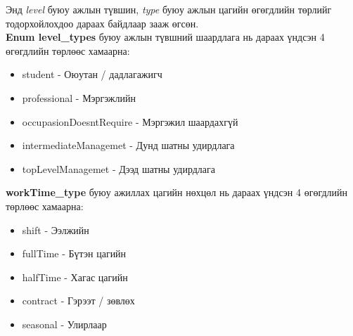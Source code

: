 Энд \textit{level} буюу ажлын түвшин, \textit{type} буюу ажлын цагийн өгөгдлийн төрлийг тодорхойлохдоо дараах байдлаар зааж өгсөн.
\\\textbf{Enum level\_types} буюу ажлын түвшний шаардлага нь дараах үндсэн 4 өгөгдлийн төрлөөс хамаарна:
\begin{itemize}
  \item student - Оюутан / дадлагажигч
  \item professional - Мэргэжлийн
  \item occupasionDoesntRequire - Мэргэжил шаардахгүй
  \item intermediateManagemet - Дунд шатны удирдлага
  \item topLevelManagemet - Дээд шатны удирдлага
\end{itemize}
\textbf{workTime\_type} буюу ажиллах цагийн нөхцөл нь дараах үндсэн 4 өгөгдлийн төрлөөс хамаарна:
\begin{itemize}
  \item shift - Ээлжийн
  \item fullTime - Бүтэн цагийн
  \item halfTime - Хагас цагийн
  \item contract - Гэрээт / зөвлөх
  \item seasonal - Улирлаар
\end{itemize}


